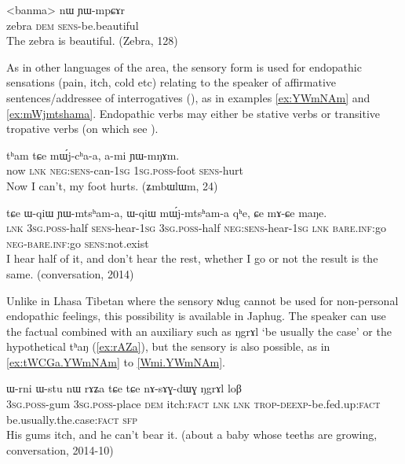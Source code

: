 \documentclass[oldfontcommands,oneside,a4paper,11pt]{article}
\newcommand{\ipa}[1]{{\phon \mbox{#1}}} %
\newcommand{\factual}[1]{\textsc{:fact}}
\begin{document}
\begin{exe}
\ex \label{ex:YWmpCAr}
\gll 
<banma> 	\ipa{nɯ}  	\ipa{ɲɯ-mpɕɤr}  \\
zebra \textsc{dem} \textsc{sens}-be.beautiful \\
\glt The zebra is beautiful. (Zebra, 128)
\end{exe}

As in other languages of the area, the sensory form is used for endopathic sensations (pain, itch, cold etc)  relating to the speaker of affirmative sentences/addressee of interrogatives (\citealt{tournadre14evidentiality}), as in examples \ref{ex:YWmNAm} and \ref{ex:mWjmtshama}. Endopathic verbs may either be stative verbs or transitive tropative verbs (on which see \citealt{jacques13tropative}).

\begin{exe}
\ex \label{ex:YWmNAm}
\gll
\ipa{tʰam} 	\ipa{tɕe} 	\ipa{mɯ́j-cʰa-a,} 	\ipa{a-mi} 	\ipa{ɲɯ-mŋɤm.} \\
now \textsc{lnk} \textsc{neg:sens}-can-\textsc{1sg} \textsc{1sg.poss}-foot \textsc{sens}-hurt \\
\glt Now I can't, my foot hurts. (\ipa{ʑmbɯlɯm}, 24)
\end{exe}

\begin{exe}
\ex \label{ex:mWjmtshama}
\gll
\ipa{tɕe} 	\ipa{ɯ-qiɯ} 	\ipa{ɲɯ-mtsʰam-a,} 	\ipa{ɯ-qiɯ} 	\ipa{mɯ́j-mtsʰam-a} 	\ipa{qʰe,} 	\ipa{ɕe} 	\ipa{mɤ-ɕe} 	\ipa{maŋe.} \\
\textsc{lnk} \textsc{3sg.poss}-half \textsc{sens}-hear-\textsc{1sg}   \textsc{3sg.poss}-half \textsc{neg:sens}-hear-\textsc{1sg}  \textsc{lnk}  \textsc{bare.inf}:go \textsc{neg}-\textsc{bare.inf}:go \textsc{sens}:not.exist \\
\glt I hear half of it, and don't hear the rest, whether I go or not the result is the same. (conversation, 2014)
\end{exe}


Unlike in Lhasa Tibetan where the sensory \ipa{ɴdug} cannot be used for non-personal endopathic feelings, this possibility is available in Japhug. The speaker can use the factual combined with an auxiliary such as \ipa{ŋgrɤl}  `be usually the case' or the hypothetical \ipa{tʰaŋ} (\ref{ex:rAZa}), but the sensory is also possible, as in \ref{ex:tWCGa.YWmNAm} to \ref{Wmi.YWmNAm}.


\begin{exe}
\ex \label{ex:rAZa}
\gll
\ipa{ɯ-rni}  	\ipa{ɯ-stu}  	\ipa{nɯ}  	\ipa{rɤʑa}  	\ipa{tɕe}  	\ipa{tɕe}  	\ipa{nɤ-sɤɣ-dɯɣ}  	\ipa{ŋgrɤl}  	\ipa{loβ}  \\
\textsc{3sg.poss}-gum \textsc{3sg.poss}-place \textsc{dem} itch\factual{} \textsc{lnk} \textsc{lnk} \textsc{trop-deexp}-be.fed.up\factual{} be.usually.the.case\factual{} \textsc{sfp} \\
\glt His gums itch, and he can't bear it. (about a baby whose teeths are growing, conversation, 2014-10)
\end{exe}
\end{document}
